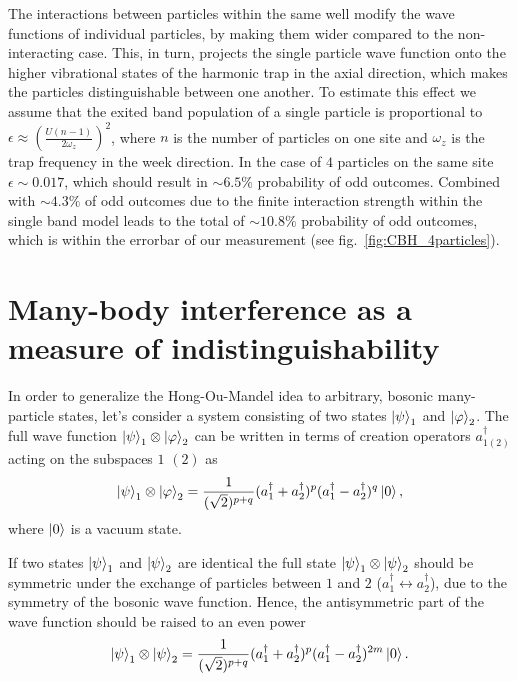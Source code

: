 The interactions between particles within the same well modify the wave functions of individual particles, by making them wider compared to the non-interacting case. This, in turn, projects the single particle wave function onto the higher vibrational states of the harmonic trap in the axial direction, which makes the particles distinguishable between one another. To estimate this effect we assume that the exited band population of a single particle is proportional to $\epsilon \approx (\frac{U(n-1)}{2 \omega_z})^2$, where $n$ is the number of particles on one site and $\omega_z$ is the trap frequency in the week direction. In the case of $4$ particles on the same site $\epsilon\sim0.017$, which should result in $\sim 6.5\%$ probability of odd outcomes. Combined with $\sim 4.3\%$ of odd outcomes due to the finite interaction strength within the single band model leads to the total of $\sim 10.8\%$ probability of odd outcomes, which is within the errorbar of our measurement (see fig.~\ref{fig:CBH_4particles}).

\section{Many-body interference as a measure of indistinguishability}
In order to generalize the Hong-Ou-Mandel idea to arbitrary, bosonic many-particle states, let's consider a system consisting of two states $\left|\psi\right\rangle_1$ and $\left|\varphi\right\rangle_2$. The full wave function $\left|\psi\right\rangle_1 \otimes \left|\varphi\right\rangle_2$ can be written in terms of creation operators $a_{1(2)}^{\dagger}$ acting on the subspaces $1$ $(2)$ as
\begin{equation}
\left|\psi\right\rangle_1 \otimes \left|\varphi\right\rangle_2 = \frac{1}{(\sqrt{2})^{p+q}}(a^{\dagger}_1 + a^{\dagger}_2)^p(a^{\dagger}_1 - a^{\dagger}_2)^q\left|0\right\rangle,
\end{equation}
where $\left|0\right\rangle$ is a vacuum state.

If two states $\left|\psi\right\rangle_1$ and $\left|\psi\right\rangle_2$ are identical the full state $\left|\psi\right\rangle_1 \otimes \left|\psi\right\rangle_2$ should be symmetric under the exchange of particles between $1$ and $2$ ($a_{1}^{\dagger} \leftrightarrow a_2^{\dagger}$), due to the symmetry of the bosonic wave function. Hence, the antisymmetric part of the wave function should be raised to an even power
\begin{equation}
\left|\psi\right\rangle_1 \otimes \left|\psi\right\rangle_2 = \frac{1}{(\sqrt{2})^{p+q}}(a^{\dagger}_1 + a^{\dagger}_2)^p(a^{\dagger}_1 - a^{\dagger}_2)^{2m}\left|0\right\rangle.
\end{equation}

